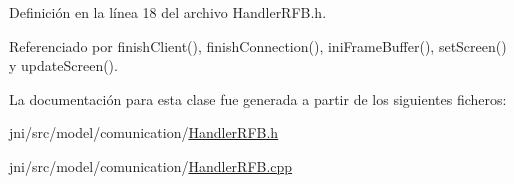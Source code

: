 Definición en la línea 18 del archivo Handler\-R\-F\-B.\-h.



Referenciado por finish\-Client(), finish\-Connection(), ini\-Frame\-Buffer(), set\-Screen() y update\-Screen().



La documentación para esta clase fue generada a partir de los siguientes ficheros\-:\begin{DoxyCompactItemize}
\item 
jni/src/model/comunication/\hyperlink{HandlerRFB_8h}{Handler\-R\-F\-B.\-h}\item 
jni/src/model/comunication/\hyperlink{HandlerRFB_8cpp}{Handler\-R\-F\-B.\-cpp}\end{DoxyCompactItemize}
